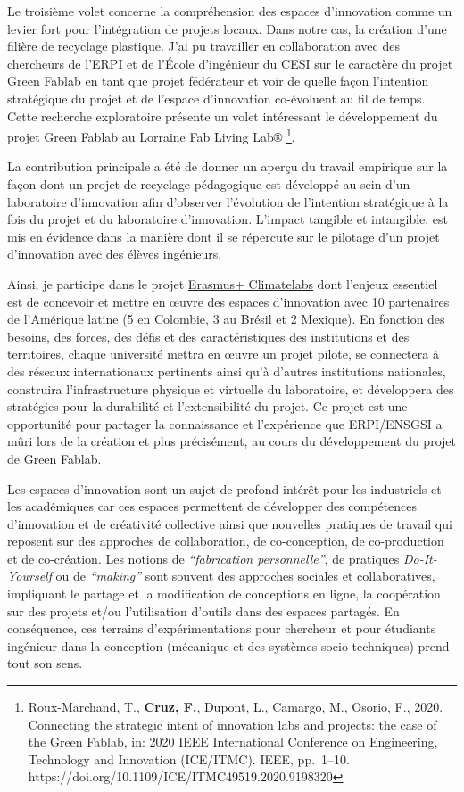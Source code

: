 \documentclass[
  11pt,
]{article}
\begin{document}
Le troisième volet concerne la compréhension des espaces d'innovation
comme un levier fort pour l'intégration de projets locaux. Dans notre
cas, la création d'une filière de recyclage plastique. J'ai pu
travailler en collaboration avec des chercheurs de l'ERPI et de l'École
d'ingénieur du CESI sur le caractère du projet Green Fablab en tant que
projet fédérateur et voir de quelle façon l'intention stratégique du
projet et de l'espace d'innovation co-évoluent au fil de temps. Cette
recherche exploratoire présente un volet intéressant le développement du
projet Green Fablab au Lorraine Fab Living Lab® \footnote{Roux-Marchand,
  T., \textbf{Cruz, F.}, Dupont, L., Camargo, M., Osorio, F., 2020.
  Connecting the strategic intent of innovation labs and projects: the
  case of the Green Fablab, in: 2020 IEEE International Conference on
  Engineering, Technology and Innovation (ICE/ITMC). IEEE, pp.~1--10.
  https://doi.org/10.1109/ICE/ITMC49519.2020.9198320}.

La contribution principale a été de donner un aperçu du travail
empirique sur la façon dont un projet de recyclage pédagogique est
développé au sein d'un laboratoire d'innovation afin d'observer
l'évolution de l'intention stratégique à la fois du projet et du
laboratoire d'innovation. L'impact tangible et intangible, est mis en
évidence dans la manière dont il se répercute sur le pilotage d'un
projet d'innovation avec des élèves ingénieurs.

Ainsi, je participe dans le projet
\href{https://erpi.univ-lorraine.fr/fr/projects/Climatelabs/}{Erasmus+
Climatelabs} dont l'enjeux essentiel est de concevoir et mettre en œuvre
des espaces d'innovation avec 10 partenaires de l'Amérique latine (5 en
Colombie, 3 au Brésil et 2 Mexique). En fonction des besoins, des
forces, des défis et des caractéristiques des institutions et des
territoires, chaque université mettra en œuvre un projet pilote, se
connectera à des réseaux internationaux pertinents ainsi qu'à d'autres
institutions nationales, construira l'infrastructure physique et
virtuelle du laboratoire, et développera des stratégies pour la
durabilité et l'extensibilité du projet. Ce projet est une opportunité
pour partager la connaissance et l'expérience que ERPI/ENSGSI a mûri
lors de la création et plus précisément, au cours du développement du
projet de Green Fablab.

Les espaces d'innovation sont un sujet de profond intérêt pour les
industriels et les académiques car ces espaces permettent de développer
des compétences d'innovation et de créativité collective ainsi que
nouvelles pratiques de travail qui reposent sur des approches de
collaboration, de co-conception, de co-production et de co-création. Les
notions de \emph{``fabrication personnelle''}, de pratiques
\emph{Do-It-Yourself} ou de \emph{``making''} sont souvent des approches
sociales et collaboratives, impliquant le partage et la modification de
conceptions en ligne, la coopération sur des projets et/ou l'utilisation
d'outils dans des espaces partagés. En conséquence, ces terrains
d'expérimentations pour chercheur et pour étudiants ingénieur dans la
conception (mécanique et des systèmes socio-techniques) prend tout son
sens.
\end{document}
